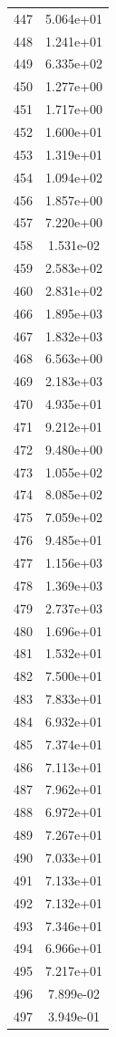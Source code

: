 \documentclass[12pt]{article}
\begin{document}
\begin{longtable}{@{}cc@{}}
447 & 5.064e+01 \\
448 & 1.241e+01 \\
449 & 6.335e+02 \\
450 & 1.277e+00 \\
451 & 1.717e+00 \\
452 & 1.600e+01 \\
453 & 1.319e+01 \\
454 & 1.094e+02 \\
456 & 1.857e+00 \\
457 & 7.220e+00 \\
458 & 1.531e-02 \\
459 & 2.583e+02 \\
460 & 2.831e+02 \\
466 & 1.895e+03 \\
467 & 1.832e+03 \\
468 & 6.563e+00 \\
469 & 2.183e+03 \\
470 & 4.935e+01 \\
471 & 9.212e+01 \\
472 & 9.480e+00 \\
473 & 1.055e+02 \\
474 & 8.085e+02 \\
475 & 7.059e+02 \\
476 & 9.485e+01 \\
477 & 1.156e+03 \\
478 & 1.369e+03 \\
479 & 2.737e+03 \\
480 & 1.696e+01 \\
481 & 1.532e+01 \\
482 & 7.500e+01 \\
483 & 7.833e+01 \\
484 & 6.932e+01 \\
485 & 7.374e+01 \\
486 & 7.113e+01 \\
487 & 7.962e+01 \\
488 & 6.972e+01 \\
489 & 7.267e+01 \\
490 & 7.033e+01 \\
491 & 7.133e+01 \\
492 & 7.132e+01 \\
493 & 7.346e+01 \\
494 & 6.966e+01 \\
495 & 7.217e+01 \\
496 & 7.899e-02 \\
497 & 3.949e-01 \\

\end{longtable}
\end{document}
